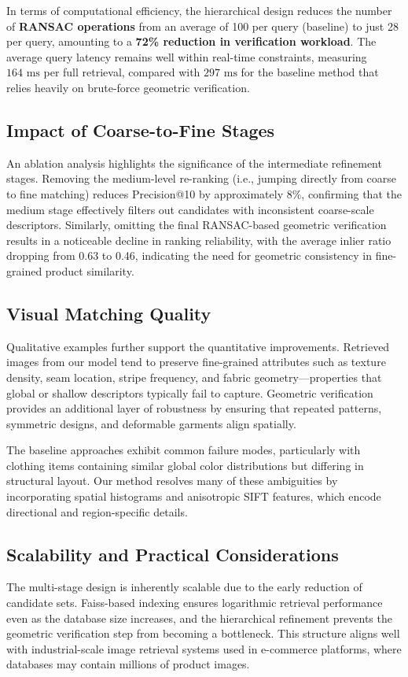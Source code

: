 \documentclass[conference]{IEEEtran}
\begin{document}
In terms of computational efficiency, the hierarchical design reduces the number of \textbf{RANSAC operations} from an average of 100 per query (baseline) to just 28 per query, amounting to a \textbf{72\% reduction in verification workload}. The average query latency remains well within real-time constraints, measuring $164\text{ ms}$ per full retrieval, compared with $297\text{ ms}$ for the baseline method that relies heavily on brute-force geometric verification.

\subsection{Impact of Coarse-to-Fine Stages}
An ablation analysis highlights the significance of the intermediate refinement stages. Removing the medium-level re-ranking (i.e., jumping directly from coarse to fine matching) reduces Precision@10 by approximately 8\%, confirming that the medium stage effectively filters out candidates with inconsistent coarse-scale descriptors. Similarly, omitting the final RANSAC-based geometric verification results in a noticeable decline in ranking reliability, with the average inlier ratio dropping from 0.63 to 0.46, indicating the need for geometric consistency in fine-grained product similarity.

\subsection{Visual Matching Quality}
Qualitative examples further support the quantitative improvements. Retrieved images from our model tend to preserve fine-grained attributes such as texture density, seam location, stripe frequency, and fabric geometry—properties that global or shallow descriptors typically fail to capture. Geometric verification provides an additional layer of robustness by ensuring that repeated patterns, symmetric designs, and deformable garments align spatially.

The baseline approaches exhibit common failure modes, particularly with clothing items containing similar global color distributions but differing in structural layout. Our method resolves many of these ambiguities by incorporating spatial histograms and anisotropic SIFT features, which encode directional and region-specific details.

\subsection{Scalability and Practical Considerations}
The multi-stage design is inherently scalable due to the early reduction of candidate sets. Faiss-based indexing ensures logarithmic retrieval performance even as the database size increases, and the hierarchical refinement prevents the geometric verification step from becoming a bottleneck. This structure aligns well with industrial-scale image retrieval systems used in e-commerce platforms, where databases may contain millions of product images.
\end{document}

